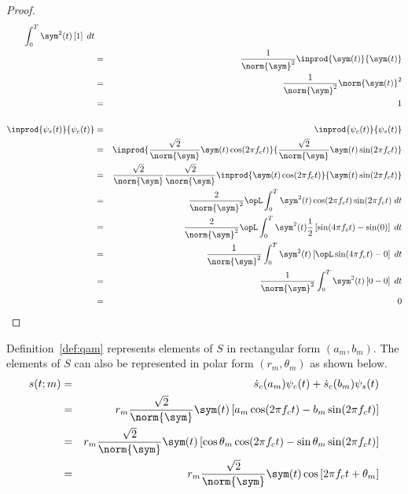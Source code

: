 \begin{proof}
\begin{eqnarray*}
          \int_0^T \sym^2(t)\left[ 1 \right] \; dt
    \\&=& \frac{1}{\norm{\sym}^2}
          \inprod{\sym(t)}{\sym(t)}
    \\&=& \frac{1}{\norm{\sym}^2}
          \norm{\sym(t)}^2
    \\&=& 1
\\ \\
   \inprod{\psi_s(t)}{\psi_c(t)}
      &=& \inprod{\psi_c(t)}{\psi_s(t)}
    \\&=& \inprod{\frac{\sqrt{2}}{\norm{\sym}} \sym(t) \cos(2\pi f_c t)}
                 {\frac{\sqrt{2}}{\norm{\sym}} \sym(t) \sin(2\pi f_c t)}
    \\&=& \frac{\sqrt{2}}{\norm{\sym}}\frac{\sqrt{2}}{\norm{\sym}}
          \inprod{ \sym(t) \cos(2\pi f_c t)}
                 { \sym(t) \sin(2\pi f_c t)}
    \\&=& \frac{2}{\norm{\sym}^2}
          \opL
          \int_0^T \sym^2(t) \cos(2\pi f_c t)\sin(2\pi f_c t) \; dt
    \\&=& \frac{2}{\norm{\sym}^2}
          \opL
          \int_0^T \sym^2(t)\frac{1}{2}
          \left[\sin(4\pi f_c t)-\sin(0)\right] \; dt
    \\&=& \frac{1}{\norm{\sym}^2}
          \int_0^T \sym^2(t)
          \left[\opL\sin(4\pi f_c t)-0\right] \; dt
    \\&=& \frac{1}{\norm{\sym}^2}
          \int_0^T \sym^2(t)
          \left[0-0\right] \; dt
    \\&=& 0
\end{eqnarray*}
\end{proof}


Definition~\ref{def:qam} represents elements of $S$ in rectangular form
$(a_m,b_m)$.
The elements of $S$ can also be represented in polar form
$(r_m,\theta_m)$ as shown below.
\begin{eqnarray*}
   s(t;m) 
     &=& \dot{s}_c(a_m) \psi_c(t) + \dot{s}_c(b_m) \psi_s(t)
   \\&=& r_m \frac{\sqrt{2}}{\norm{\sym}} \sym(t) 
         \left[
            a_m \cos(2\pi f_c t) -b_m \sin(2\pi f_c t)
         \right]
   \\&=& r_m \frac{\sqrt{2}}{\norm{\sym}} \sym(t) 
         \left[
            \cos\theta_m \cos(2\pi f_c t) -\sin\theta_m \sin(2\pi f_c t)
         \right]
   \\&=& r_m \frac{\sqrt{2}}{\norm{\sym}} \sym(t)  
         \cos\left[ 2\pi f_c t + \theta_m \right]
\end{eqnarray*}



